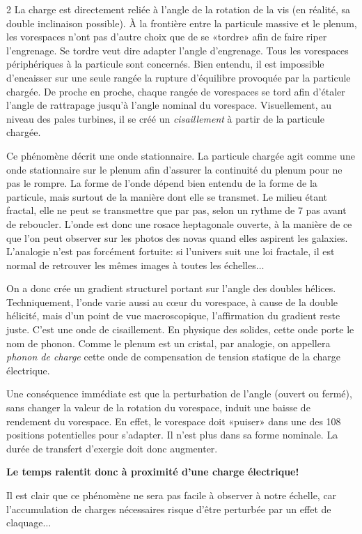 \begin{multicols}{2}
La charge est directement reliée à l'angle de la rotation de la vis
(en réalité, sa double inclinaison possible). À la frontière entre la
particule massive et le plenum, les vorespaces n'ont pas d'autre choix
que de se «tordre» afin de faire riper l'engrenage. Se tordre veut
dire adapter l'angle d'engrenage. Tous les vorespaces périphériques à
la particule sont concernés. Bien entendu, il est impossible
d'encaisser sur une seule rangée la rupture d'équilibre provoquée par
la particule chargée. De proche en proche, chaque rangée de vorespaces
se tord afin d'étaler l'angle de rattrapage jusqu'à l'angle nominal du
vorespace. Visuellement, au niveau des pales turbines, il se créé un
\textit{cisaillement} à partir de la particule chargée.

Ce phénomène décrit une onde stationnaire. La particule chargée agit
comme une onde stationnaire sur le plenum afin d'assurer la continuité
du plenum pour ne pas le rompre. La forme de l'onde dépend bien
entendu de la forme de la particule, mais surtout de la manière dont
elle se transmet. Le milieu étant fractal, elle ne peut se transmettre
que par pas, selon un rythme de 7 pas avant de reboucler. L'onde est donc une rosace heptagonale
ouverte, à la manière de ce que l'on peut observer sur les photos des
novas quand elles aspirent les galaxies. L'analogie n'est pas
forcément fortuite: si l'univers suit une loi fractale, il est
normal de retrouver les mêmes images à toutes les échelles$\ldots$

On a donc crée un gradient structurel portant sur l'angle des doubles
hélices. Techniquement, l'onde varie aussi au cœur du vorespace, à
cause de la double hélicité, mais d'un point de vue macroscopique,
l'affirmation du gradient reste juste. C'est une onde de cisaillement.
En physique des solides, cette onde porte le nom de phonon. Comme le
plenum est un cristal, par analogie, on appellera \textit{phonon de
charge} cette onde de compensation de tension statique de la charge électrique.

Une conséquence immédiate est que la perturbation de l'angle
(ouvert ou fermé), sans changer la valeur de la rotation du vorespace,
induit une baisse de rendement du vorespace. En effet, le vorespace
doit «puiser» dans une des 108 positions potentielles pour s'adapter. Il
n'est plus dans sa forme nominale. La durée de transfert d'exergie
doit donc augmenter.

\textbf{Le temps ralentit donc à proximité d'une charge électrique!}

Il est clair que ce phénomène ne sera pas facile à observer à notre
échelle, car l'accumulation de charges nécessaires risque d'être
perturbée par un effet de claquage$\dots$


\end{multicols}
